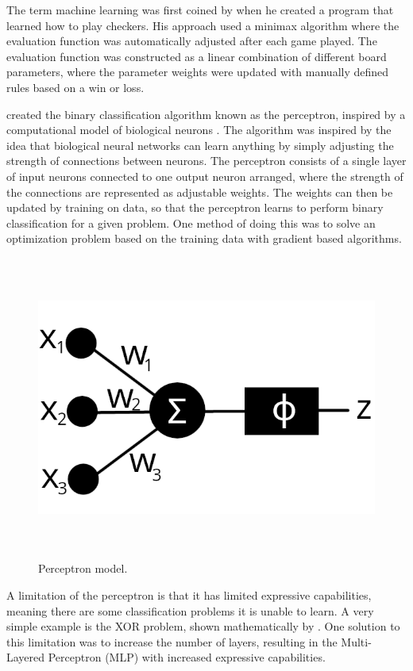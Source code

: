 \documentclass[12pt,a4paper]{book}
\begin{document}
The term machine learning was first coined by \cite{samuel59} when he created a program that learned how to play checkers. His approach used a minimax algorithm where the evaluation function was automatically adjusted after each game played. The evaluation function was constructed as a linear combination of different board parameters, where the parameter weights were updated with manually defined rules based on a win or loss.

\cite{rosenblatt57} created the binary classification algorithm known as the perceptron, inspired by a computational model of biological neurons \citep{pitts43}. The algorithm was inspired by the idea that biological neural networks can learn anything by simply adjusting the strength of connections between neurons. The perceptron consists of a single layer of input neurons connected to one output neuron arranged, where the strength of the connections are represented as adjustable weights. The weights can then be updated by training on data, so that the perceptron learns to perform binary classification for a given problem. One method of doing this was to solve an optimization problem based on the training data with gradient based algorithms.

\begin{figure}[H]
    \centering
    \includegraphics[height=10cm]{figs/Perceptron.png}
    \caption{Perceptron model.}
    \label{fig:perceptron}
\end{figure}

A limitation of the perceptron is that it has limited expressive capabilities, meaning there are some classification problems it is unable to learn. A very simple example is the XOR problem, shown mathematically by \cite{perceptronsbook}. One solution to this limitation was to increase the number of layers, resulting in the Multi-Layered Perceptron (MLP) with increased expressive capabilities.
\end{document}
